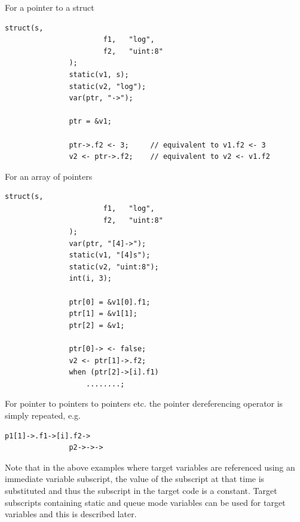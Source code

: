             For a pointer to a struct
            \begin{lstlisting}[gobble=12, language=threepl]
               struct(s,
                       f1,   "log",
                       f2,   "uint:8"
               );
               static(v1, s);
               static(v2, "log");
               var(ptr, "->");

               ptr = &v1;

               ptr->.f2 <- 3;     // equivalent to v1.f2 <- 3
               v2 <- ptr->.f2;    // equivalent to v2 <- v1.f2
            \end{lstlisting}

            For an array of pointers
            \begin{lstlisting}[gobble=12, language=threepl]
               struct(s,
                       f1,   "log",
                       f2,   "uint:8"
               );
               var(ptr, "[4]->");
               static(v1, "[4]s");
               static(v2, "uint:8");
               int(i, 3);

               ptr[0] = &v1[0].f1;
               ptr[1] = &v1[1];
               ptr[2] = &v1;

               ptr[0]-> <- false;
               v2 <- ptr[1]->.f2;
               when (ptr[2]->[i].f1)
                   ........;
            \end{lstlisting}

            For pointer to pointers to pointers etc. the pointer
            dereferencing operator is simply repeated, e.g.
            \begin{lstlisting}[gobble=12, language=threepl]
               p1[1]->.f1->[i].f2->
               p2->->->
            \end{lstlisting}

            Note that in the above examples where target variables are
            referenced using an immediate variable subscript, the value of
            the subscript at that time is substituted and thus the subscript
            in the target code is a constant. Target subscripts containing
            static and queue mode variables can be used for target variables
            and this is described later.
            
